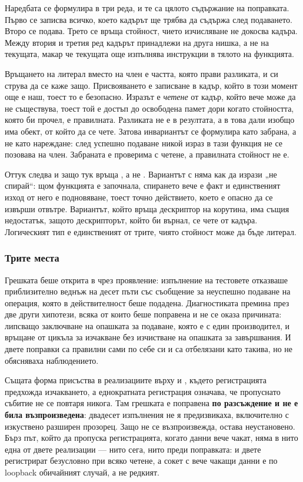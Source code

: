 Наредбата се формулира в три реда, и те са цялото съдържание на поправката. Първо се
записва всичко, което кадърът ще трябва да съдържа след подаването. Второ се подава. Трето
се връща стойност, чието изчисляване не докосва кадъра. Между втория и третия ред кадърът
принадлежи на друга нишка, а не на текущата, макар че текущата още изпълнява инструкции в
тялото на функцията.

Връщането на литерал вместо на член е частта, която прави разликата, и си струва да се каже
защо. Присвояването  е записване в кадър, който в този момент още е
наш, тоест то е безопасно. Изразът  е \emph{четене} от кадър, който
вече може да не съществува, тоест той е достъп до освободена памет дори когато стойността,
която би прочел, е правилната. Разликата не е в резултата, а в това дали изобщо има обект,
от който да се чете. Затова инвариантът се формулира като забрана, а не като нареждане:
след успешно подаване никой израз в тази функция не се позовава на член. Забраната е
проверима с четене, а правилната стойност не е.

Оттук следва и защо  тук връща , а не . Вариантът
с  няма как да изрази „не спирай“: щом функцията е започнала, спирането вече е
факт и единственият изход от него е подновяване, тоест точно действието, което е опасно да
се извърши отвътре. Вариантът, който връща дескриптор на корутина, има същия недостатък,
защото дескрипторът, който би върнал, се чете от кадъра. Логическият тип е единственият от
трите, чиято стойност може да бъде литерал.

\subsubsection{Трите места}

Грешката беше открита в  чрез проявление: изпълнение на тестовете отказваше
приблизително веднъж на десет пъти със съобщение за неуспешно подаване на операция, която в
действителност беше подадена. Диагностиката премина през две други хипотези, всяка от които
беше поправена и не се оказа причината: липсващо заключване на опашката за подаване, която е
с един производител, и връщане от цикъла за изчакване без изчистване на опашката за
завършвания. И двете поправки са правилни сами по себе си и са отбелязани като такива, но не
обясняваха наблюдението.

Същата форма присъства в реализациите върху  и , където
регистрацията предхожда изчакването, а еднократната регистрация означава, че пропуснато
събитие не се повтаря никога. Там грешката е поправена \textbf{по разсъждение и не е била
възпроизведена}: двадесет изпълнения не я предизвикаха, включително с изкуствено разширен
прозорец. Защо не се възпроизвежда, остава неустановено. Бърз път, който да пропуска регистрацията,
когато данни вече чакат, няма в нито една от двете реализации — нито сега, нито преди
поправката: и двете регистрират безусловно при всяко четене, а сокет с вече чакащи данни е по
loopback обичайният случай, а не редкият.

